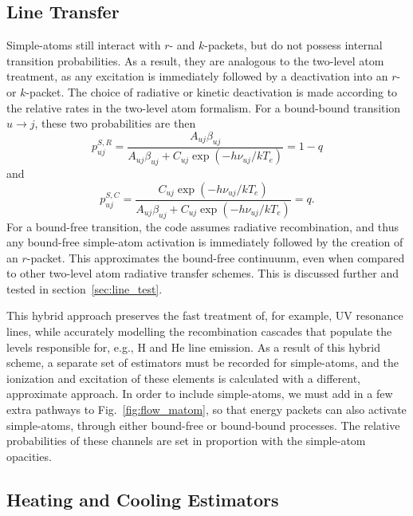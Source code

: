 \subsection{Line Transfer}

Simple-atoms still interact with $r$- and $k$-packets,
but do not possess internal transition probabilities. As a result,
they are analogous to the two-level atom treatment, as any excitation
is immediately followed by a deactivation into an $r$- or $k$-packet.
The choice of radiative or kinetic deactivation is made according 
to the relative rates in the two-level atom formalism. 
For a bound-bound transition $u\rightarrow j$, these two probabilities
are then
\begin{equation}
p_{uj}^{S,R} = \frac{ A_{uj} \beta_{uj} }
{ A_{uj} \beta_{uj} + C_{uj} \exp(-h\nu_{uj} / k T_e) }
= 1 - q
\end{equation}
and
\begin{equation}
p_{uj}^{S,C} = \frac{ C_{uj} \exp(-h\nu_{uj} / k T_e) }
{ A_{uj} \beta_{uj} + C_{uj} \exp(-h\nu_{uj} / k T_e) }
= q.
\end{equation}
For a bound-free transition, the code assumes radiative recombination, and 
thus any bound-free simple-atom activation is immediately followed 
by the creation of an $r$-packet. This approximates the bound-free continuunm, 
even when compared to other two-level atom radiative transfer schemes. 
This is discussed further and tested in section~\ref{sec:line_test}.

This hybrid approach preserves the fast treatment 
of, for example, UV resonance lines, while accurately 
modelling the recombination cascades that populate the levels 
responsible for, e.g., H and He line emission. As a result of this hybrid
scheme, a separate set of estimators must be recorded for simple-atoms, 
and the ionization and excitation of these elements is calculated 
with a different, approximate approach.
In order to include simple-atoms, we must add in a few extra pathways
to Fig.~\ref{fig:flow_matom}, so that energy packets can also
activate simple-atoms, through either bound-free or bound-bound
processes. The relative probabilities of these channels are set
in proportion with the simple-atom opacities.


\subsection{Heating and Cooling Estimators}
\label{sec:simple_hc}

